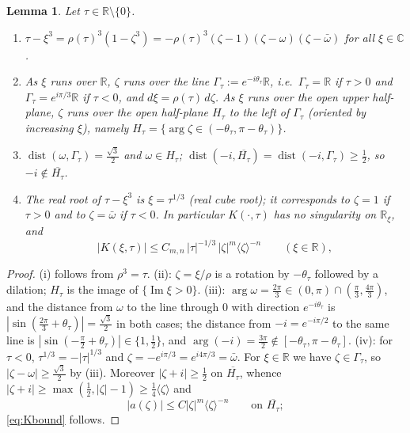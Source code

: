 \documentclass[10pt,reqno]{amsart}
\newtheorem{lemma}[theorem]{Lemma}
\theoremstyle{remark}
\numberwithin{equation}{section}
\newcommand{\R}{\mathbb R}
\newcommand{\Com}{\mathbb{C}}
\newcommand{\om}{\omega}
\newcommand{\ima}{\operatorname{Im}}
\newcommand{\dist}{\operatorname{dist}}
\newcommand{\lan}{\langle}
\newcommand{\ran}{\rangle}
\begin{document}
\begin{lemma}\label{lem:algebra}
Let $\tau\in\R\setminus\{0\}$.
\begin{enumerate}
\item[(i)] $\tau-\xi^3=\rho(\tau)^3(1-\zeta^3)=-\rho(\tau)^3(\zeta-1)(\zeta-\om)(\zeta-\bar\om)$ for all $\xi\in\Com$.
\item[(ii)] As $\xi$ runs over $\R$, $\zeta$ runs over the line $\Gamma_\tau:=e^{-i\theta_\tau}\R$, i.e.\ $\Gamma_\tau=\R$ if $\tau>0$ and $\Gamma_\tau=e^{i\pi/3}\R$ if $\tau<0$, and $d\xi=\rho(\tau)\,d\zeta$. As $\xi$ runs over the open upper half-plane, $\zeta$ runs over the open half-plane $H_\tau$ to the left of $\Gamma_\tau$ (oriented by increasing $\xi$), namely $H_\tau=\{\arg\zeta\in(-\theta_\tau,\pi-\theta_\tau)\}$.
\item[(iii)] $\dist(\om,\Gamma_\tau)=\frac{\sqrt3}2$ and $\om\in H_\tau$; $\dist(-i,\overline{H_\tau})=\dist(-i,\Gamma_\tau)\ge\frac12$, so $-i\notin\overline{H_\tau}$.
\item[(iv)] The real root of $\tau-\xi^3$ is $\xi=\tau^{1/3}$ (real cube root); it corresponds to $\zeta=1$ if $\tau>0$ and to $\zeta=\bar\om$ if $\tau<0$. In particular $K(\cdot,\tau)$ has no singularity on $\R_\xi$, and
\begin{equation}\label{eq:Kbound}
|K(\xi,\tau)|\le C_{m,n}\,|\tau|^{-1/3}\,|\zeta|^m\lan\zeta\ran^{-n}\qquad(\xi\in\R),
\end{equation}

\end{enumerate}
\end{lemma}
\begin{proof}
(i) follows from $\rho^3=\tau$. (ii): $\zeta=\xi/\rho$ is a rotation by $-\theta_\tau$ followed by a dilation; $H_\tau$ is the image of $\{\ima\xi>0\}$. (iii): $\arg\om=\frac{2\pi}3\in(0,\pi)\cap(\frac\pi3,\frac{4\pi}3)$, and the distance from $\om$ to the line through $0$ with direction $e^{-i\theta_\tau}$ is $|\sin(\frac{2\pi}3+\theta_\tau)|=\frac{\sqrt3}2$ in both cases; the distance from $-i=e^{-i\pi/2}$ to the same line is $|\sin(-\frac\pi2+\theta_\tau)|\in\{1,\frac12\}$, and $\arg(-i)=\frac{3\pi}2\notin[-\theta_\tau,\pi-\theta_\tau]$. (iv): for $\tau<0$, $\tau^{1/3}=-|\tau|^{1/3}$ and $\zeta=-e^{i\pi/3}=e^{i4\pi/3}=\bar\om$. For $\xi\in\R$ we have $\zeta\in\Gamma_\tau$, so $|\zeta-\om|\ge\frac{\sqrt3}2$ by (iii). Moreover $|\zeta+i|\ge\frac12$ on $\overline{H_\tau}$, whence $|\zeta+i|\ge\max(\frac12,|\zeta|-1)\ge\frac14\lan\zeta\ran$ and
\begin{equation}\label{eq:abound}
|a(\zeta)|\le C|\zeta|^m\lan\zeta\ran^{-n}\qquad\text{on }\overline{H_\tau};
\end{equation}
\eqref{eq:Kbound} follows.
\end{proof}
\end{document}
